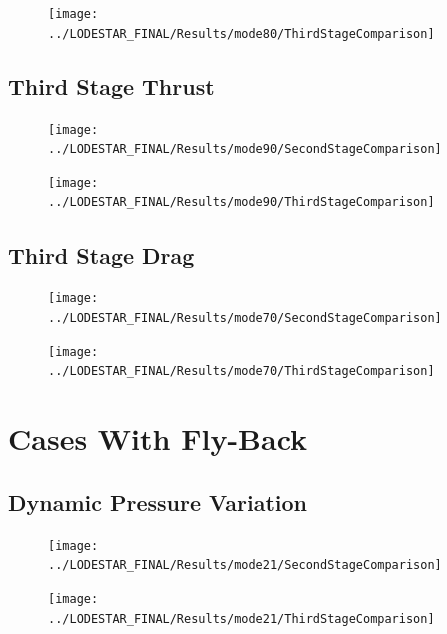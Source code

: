 \begin{figure}[th]
\centering
\texttt{[image: ../LODESTAR\_FINAL/Results/mode80/ThirdStageComparison]}
\caption{}
\label{fig:ThirdStageComparison6}
\end{figure}

\FloatBarrier
\subsection{Third Stage Thrust}

\begin{figure}[th]
	\centering
	\texttt{[image: ../LODESTAR\_FINAL/Results/mode90/SecondStageComparison]}
	\caption{}
	\label{fig:SecondStageComparison7}
\end{figure}

\begin{figure}[th]
\centering
\texttt{[image: ../LODESTAR\_FINAL/Results/mode90/ThirdStageComparison]}
\caption{}
\label{fig:ThirdStageComparison7}
\end{figure}
\FloatBarrier
\subsection{Third Stage Drag}

\begin{figure}[th]
\centering
\texttt{[image: ../LODESTAR\_FINAL/Results/mode70/SecondStageComparison]}
\caption{}
\label{fig:SecondStageComparison8}
\end{figure}


\begin{figure}[th]
\centering
\texttt{[image: ../LODESTAR\_FINAL/Results/mode70/ThirdStageComparison]}
\caption{}
\label{fig:ThirdStageComparison8}
\end{figure}


\section{Cases With Fly-Back}

\subsection{Dynamic Pressure Variation}
\begin{figure}[th]
\centering
\texttt{[image: ../LODESTAR\_FINAL/Results/mode21/SecondStageComparison]}
\caption{}
\label{fig:SecondStageComparison9}
\end{figure}

\begin{figure}[th]
\centering
\texttt{[image: ../LODESTAR\_FINAL/Results/mode21/ThirdStageComparison]}
\caption{}
\label{fig:ThirdStageComparison9}
\end{figure}

